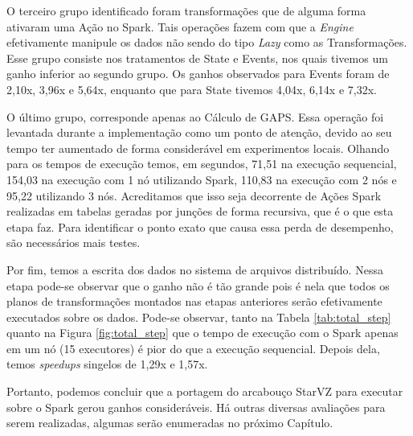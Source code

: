 O terceiro grupo identificado foram transformações que de alguma forma ativaram 
uma Ação no Spark. Tais operações fazem com que a \emph{Engine} efetivamente 
manipule os dados \cite{ref:sparkbook} não sendo do tipo \emph{Lazy} como as 
Transformações. Esse grupo consiste nos tratamentos de State e Events, nos 
quais tivemos um ganho inferior ao segundo grupo. Os ganhos observados para 
Events foram de 2,10x, 3,96x e 5,64x, enquanto que para State tivemos 4,04x, 
6,14x e 7,32x.

O último grupo, corresponde apenas ao Cálculo de GAPS. Essa operação foi 
levantada durante a implementação como um ponto de atenção, devido ao seu tempo 
ter aumentado de forma considerável em experimentos locais. Olhando para os 
tempos de execução temos, em segundos, 71,51 na execução sequencial, 154,03 na 
execução com 1 nó utilizando Spark, 110,83 na execução com 2 nós e 95,22 
utilizando 3 nós. Acreditamos que isso seja decorrente de Ações Spark 
realizadas em tabelas geradas por junções de forma recursiva, que é o que esta 
etapa faz. Para identificar o ponto exato que causa essa perda de desempenho, 
são necessários mais testes.

Por fim, temos a escrita dos dados no sistema de arquivos distribuído. Nessa 
etapa pode-se observar que o ganho não é tão grande pois é nela que todos os 
planos de transformações montados nas etapas anteriores serão efetivamente 
executados sobre os dados. Pode-se observar, tanto na Tabela 
\ref{tab:total_step} quanto na Figura \ref{fig:total_step} que o tempo de 
execução com o Spark apenas em um nó (15 executores) é pior do que a execução 
sequencial. Depois dela, temos \emph{speedups} singelos de 1,29x e 1,57x.

Portanto, podemos concluir que a portagem do arcabouço StarVZ para executar 
sobre o Spark gerou ganhos consideráveis. Há outras diversas avaliações para 
serem realizadas, algumas serão enumeradas no próximo Capítulo.



